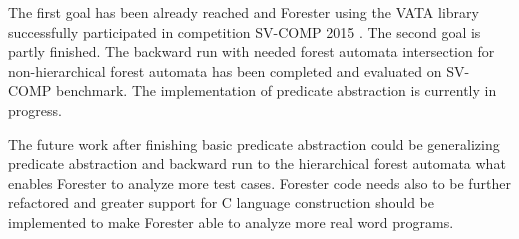 \documentclass[fleqn,11pt]{ExcelAtFIT} %
\begin{document}
The first goal has been already reached and Forester using the VATA library successfully participated in competition SV-COMP 2015 \cite{www:svcomp}.
The second goal is partly finished.
The backward run with needed forest automata intersection for non-hierarchical forest automata has been completed and evaluated on SV-COMP benchmark.
The implementation of predicate abstraction is currently in progress.

The future work after finishing basic predicate abstraction could be generalizing predicate abstraction and backward run to the hierarchical forest automata
what enables Forester to analyze more test cases.
Forester code needs also to be further refactored and greater support for C language construction should be implemented to make Forester able
to analyze more real word programs.






\end{document}
